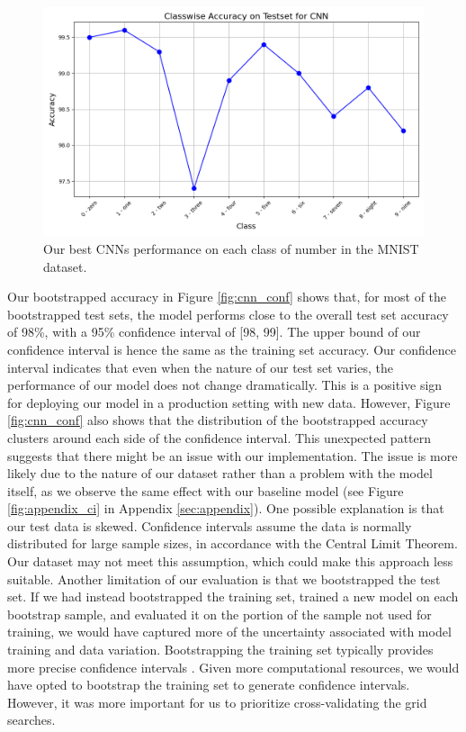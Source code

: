 \begin{figure}[H]
    \centering
    \includegraphics[width=\linewidth]{results/evaluation/CNN_classwise_acc.png}
    \caption{Our best CNNs performance on each class of number in the MNIST dataset.}
    \label{fig:ClasswiseAccuracyCNN}
\end{figure}
\newpage
Our bootstrapped accuracy in Figure \ref{fig:cnn_conf} shows that, for most of the bootstrapped test sets, the model performs close to the overall test set accuracy of 98\%, with a 95\% confidence interval of [98, 99]. The upper bound of our confidence interval is hence the same as the training set accuracy. Our confidence interval indicates that even when the nature of our test set varies, the performance of our model does not change dramatically. This is a positive sign for deploying our model in a production setting with new data. However, Figure \ref{fig:cnn_conf} also shows that the distribution of the bootstrapped accuracy clusters around each side of the confidence interval. This unexpected pattern suggests that there might be an issue with our implementation. The issue is more likely due to the nature of our dataset rather than a problem with the model itself, as we observe the same effect with our baseline model (see Figure \ref{fig:appendix_ci} in Appendix \ref{sec:appendix}). One possible explanation is that our test data is skewed. Confidence intervals assume the data is normally distributed for large sample sizes, in accordance with the Central Limit Theorem. Our dataset may not meet this assumption, which could make this approach less suitable.
\newline
\newline
Another limitation of our evaluation is that we bootstrapped the test set. If we had instead bootstrapped the training set, trained a new model on each bootstrap sample, and evaluated it on the portion of the sample not used for training, we would have captured more of the uncertainty associated with model training and data variation. Bootstrapping the training set typically provides more precise confidence intervals \cite{raschka2020ci_simulation}. Given more computational resources, we would have opted to bootstrap the training set to generate confidence intervals. However, it was more important for us to prioritize cross-validating the grid searches.
